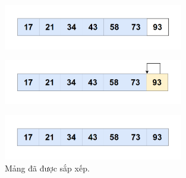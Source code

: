 \begin{itemize}
    \begin{figure}[H]
        \centering
        \includegraphics[width=0.7\textwidth]{img/insertion sort_lan2/11.png}
    \end{figure}

    \begin{figure}[H]
        \centering
        \includegraphics[width=0.7\textwidth]{img/insertion sort_lan2/12.png}
    \end{figure}

    \begin{figure}[H]
        \centering
        \includegraphics[width=0.7\textwidth]{img/insertion sort_lan2/13.png}
        \caption{Mảng đã được sắp xếp.}
    \end{figure}
\end{itemize}




